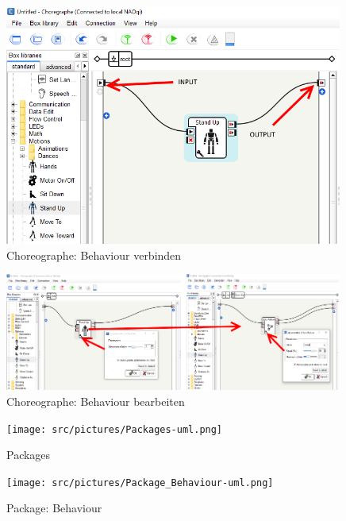 \begin{appendix}
        \begin{figure}[ht]
            \centering
            \includegraphics[width=0.99\textwidth]{src/pictures/nao-choreo-connect.png}
            \caption{Choreographe: Behaviour verbinden}
            \label{img:nao:choreo:connect}
        \end{figure}

        \begin{figure}[ht]
            \centering
            \includegraphics[width=0.99\textwidth]{src/pictures/nao-choreo-options.png}
            \caption{Choreographe: Behaviour bearbeiten}
            \label{img:nao:choreo:options}
        \end{figure}

        \cleardoubleemptypage

        \begin{figure}[ht]
            \centering
            \texttt{[image: src/pictures/Packages-uml.png]}
            \caption{Packages}
            \label{img:packages}
        \end{figure}

        \begin{figure}[ht]
            \centering
            \texttt{[image: src/pictures/Package\_Behaviour-uml.png]}
            \caption{Package: Behaviour}
            \label{img:package:behaviour}
        \end{figure}


\end{appendix}
